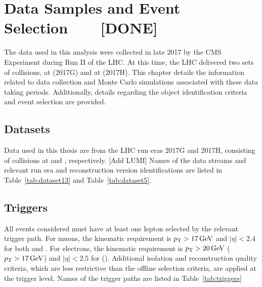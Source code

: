 \chapter{Data Samples and Event Selection~~~~[DONE]}\label{ch:data}
The data used in this analysis were collected in late 2017 by the CMS Experiment during Run II of the LHC. At this time, the LHC delivered two sets of \pp collisions, at \serag (2017G) and at \serah (2017H). This chapter details the information related to data collection and Monte Carlo simulations associated with these data taking periods. Additionally, details regarding the object identification criteria and event selection are provided.



\section{Datasets}\label{ch:data:dataset}
Data used in this thesis are from the LHC run eras 2017G and 2017H, consisting of \pp collisions at \serag and \serah, respectively. [Add LUMI] Names of the data streams and relevant run era and reconstruction version identifications are listed in Table~\ref{tab:dataset13} and Table~\ref{tab:dataset5}. 


\section{Triggers}\label{ch:data:triggers}
All events considered must have at least one lepton selected by the relevant trigger path. For muons, the kinematic requirement is $p_{\mathrm{T}}>17\,\text{Ge\hspace{-.08em}V}$ and $|\eta|<2.4$ for both \serag and \serah. For electrons, the kinematic requirement is $p_{\mathrm{T}}>20\,\text{Ge\hspace{-.08em}V}$ ($p_{\mathrm{T}}>17\,\text{Ge\hspace{-.08em}V}$) and $|\eta|<2.5$ for \serag (\serah). Additional isolation and reconstruction quality criteria, which are less restrictive than the offline selection criteria, are applied at the trigger level. Names of the trigger paths are listed in  Table~\ref{tab:triggers}




